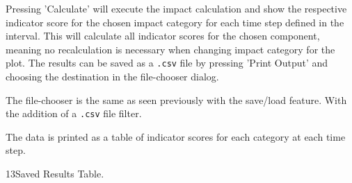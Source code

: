 
Pressing 'Calculate' will execute the impact calculation and show the respective indicator score for the chosen impact category for each time step defined in the interval. This will calculate all indicator scores for the chosen component, meaning no recalculation is necessary when changing impact category for the plot. The results can be saved as a \texttt{.csv} file by pressing 'Print Output' and choosing the destination in the file-chooser dialog.


The file-chooser is the same as seen previously with the save/load feature. With the addition of a \texttt{.csv} file filter. 

The data is printed as a table of indicator scores for each category at each time step.

\guide
{13}{Saved Results Table.}

